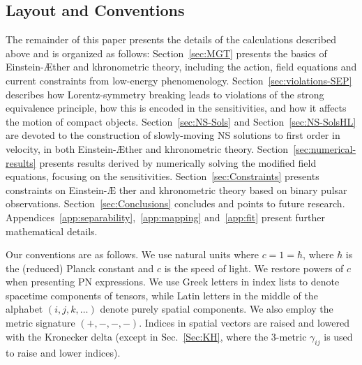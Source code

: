 \documentclass[prd,aps,twocolumn,nofootinbib,showpacs,superscriptaddress]{revtex4-1}
\begin{document}
\subsection{Layout and Conventions}

The remainder of this paper presents the details of the calculations
described above and is organized as follows:
%
Section~\ref{sec:MGT} presents the basics of Einstein-\AE ther and khronometric theory, 
including the action, field equations
and current constraints from low-energy phenomenology.
%
Section~\ref{sec:violations-SEP} describes how Lorentz-symmetry 
breaking leads to violations of the strong equivalence principle, how this is encoded
in the sensitivities, and how it affects the motion of compact objects.
%
Section~\ref{sec:NS-Sols}  and Section~\ref{sec:NS-SolsHL} are devoted
to the construction of slowly-moving NS solutions to first order in
velocity, in both Einstein-\AE ther and khronometric theory. 
%
Section~\ref{sec:numerical-results} presents results derived by
numerically solving the modified field equations, focusing on the
sensitivities. 
%
Section~\ref{sec:Constraints} presents constraints on Einstein-\AE
ther and khronometric theory based on binary pulsar
observations. 
%
Section~\ref{sec:Conclusions} concludes and points to future research.    
%
Appendices~\ref{app:separability},~\ref{app:mapping} and~\ref{app:fit}
present further mathematical details.  

Our conventions are as follows. We use natural units where
$c=1=\hbar$, where $\hbar$ is the (reduced) Planck constant and $c$ 
is the speed of light. We restore powers of $c$ when presenting
PN expressions. We use Greek letters in index lists to
denote spacetime components of tensors, while Latin letters in the
middle of the alphabet $(i,j,k,\ldots)$ denote purely spatial
components. We also employ the metric signature $(+,-,-,-)$. 
Indices in spatial vectors are raised and lowered with the Kronecker delta (except in Sec.~\ref{Sec:KH},  where the 3-metric $\gamma_{ij}$ is used to raise and lower indices). 
\end{document}
